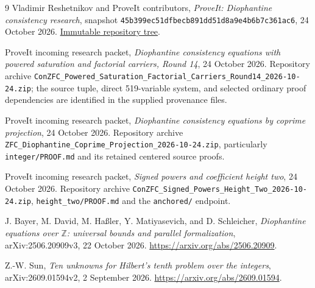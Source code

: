 \documentclass[11pt,a4paper]{article}
\theoremstyle{definition}
\theoremstyle{remark}
\newcommand{\file}[1]{\nolinkurl{#1}}
\begin{document}
\begin{thebibliography}{9}
Vladimir Reshetnikov and ProveIt contributors,
\emph{ProveIt: Diophantine consistency research}, snapshot
\file{45b399ec51dfbecb891dd51d8a9e4b6b7c361ac6}, 24 October 2026.
\href{https://github.com/VladimirReshetnikov/ProveIt/tree/45b399ec51dfbecb891dd51d8a9e4b6b7c361ac6/Computability/DiophantineConsistency}{Immutable repository tree}.

ProveIt incoming research packet,
\emph{Diophantine consistency equations with powered saturation and
factorial carriers, Round 14}, 24 October 2026.
Repository archive
\file{ConZFC_Powered_Saturation_Factorial_Carriers_Round14_2026-10-24.zip};
the source tuple, direct 519-variable system, and selected ordinary proof
dependencies are identified in the supplied provenance files.

ProveIt incoming research packet,
\emph{Diophantine consistency equations by coprime projection},
24 October 2026. Repository archive
\file{ZFC_Diophantine_Coprime_Projection_2026-10-24.zip}, particularly
\file{integer/PROOF.md} and its retained centered source proofs.

ProveIt incoming research packet,
\emph{Signed powers and coefficient height two}, 24 October 2026.
Repository archive \file{ConZFC_Signed_Powers_Height_Two_2026-10-24.zip},
\file{height_two/PROOF.md} and the \file{anchored/} endpoint.

J. Bayer, M. David, M. Ha\ss ler, Y. Matiyasevich, and D. Schleicher,
\emph{Diophantine equations over $\mathbb Z$: universal bounds and
parallel formalization}, arXiv:2506.20909v3, 22 October 2026.
\url{https://arxiv.org/abs/2506.20909}.

Z.-W. Sun,
\emph{Ten unknowns for Hilbert's tenth problem over the integers},
arXiv:2609.01594v2, 2 September 2026.
\url{https://arxiv.org/abs/2609.01594}.
\end{thebibliography}
\end{document}
